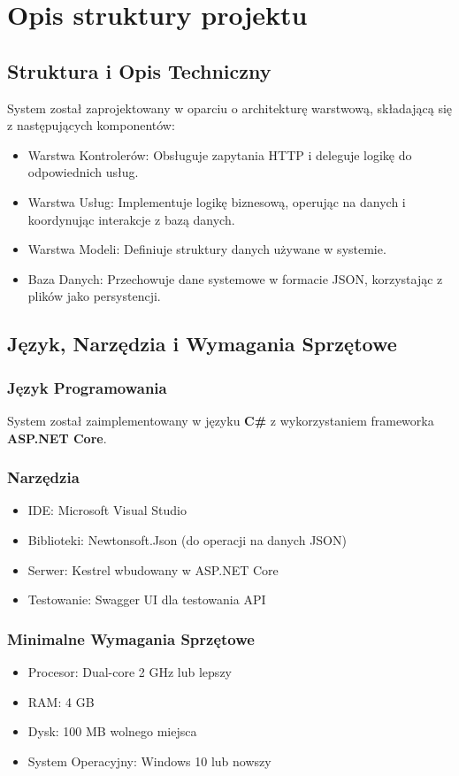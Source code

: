 \chapter{Opis struktury projektu}

\section{Struktura i Opis Techniczny}
System został zaprojektowany w oparciu o architekturę warstwową, składającą się z następujących komponentów:
\begin{itemize}
    \item Warstwa Kontrolerów: Obsługuje zapytania HTTP i deleguje logikę do odpowiednich usług.
    \item Warstwa Usług: Implementuje logikę biznesową, operując na danych i koordynując interakcje z bazą danych.
    \item Warstwa Modeli: Definiuje struktury danych używane w systemie.
    \item Baza Danych: Przechowuje dane systemowe w formacie JSON, korzystając z plików jako persystencji.
\end{itemize}

\section{Język, Narzędzia i Wymagania Sprzętowe}
\subsection{Język Programowania}
System został zaimplementowany w języku \textbf{C\#} z wykorzystaniem frameworka \textbf{ASP.NET Core}.

\subsection{Narzędzia}
\begin{itemize}
    \item IDE: Microsoft Visual Studio
    \item Biblioteki: Newtonsoft.Json (do operacji na danych JSON)
    \item Serwer: Kestrel wbudowany w ASP.NET Core
    \item Testowanie: Swagger UI dla testowania API
\end{itemize}

\subsection{Minimalne Wymagania Sprzętowe}
\begin{itemize}
    \item Procesor: Dual-core 2 GHz lub lepszy
    \item RAM: 4 GB
    \item Dysk: 100 MB wolnego miejsca
    \item System Operacyjny: Windows 10 lub nowszy
\end{itemize}

